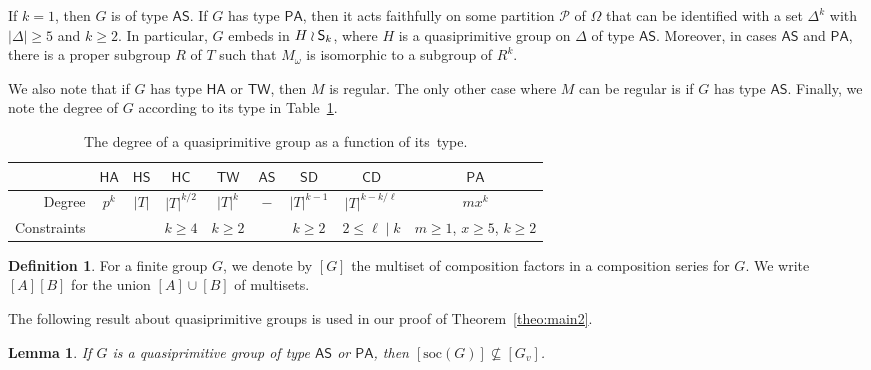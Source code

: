 \documentclass[twoside,12pt,leqno]{amsproc}
\numberwithin{table}{section}
\numberwithin{figure}{section}
\theoremstyle{plain}
\newtheorem{lemma}[theorem]{Lemma}
\theoremstyle{definition}\newtheorem{definition}[theorem]{Definition}
\theoremstyle{definition}\newtheorem{example}[theorem]{Example}
\theoremstyle{definition}\newtheorem{construction}[theorem]{Construction}
\theoremstyle{definition}\newtheorem{remark}[theorem]{Remark}
\theoremstyle{definition}\newtheorem{problem}[theorem]{Problem}
\begin{document}
If $k=1$, then $G$ is of type ${\mathsf{AS}}$. If $G$ has type ${\mathsf{PA}}$, then it acts faithfully on some partition $\mathcal{P}$ of $\Omega$ that can be identified with a set $\Delta^k$ with $|\Delta|{\geqslant} 5$ and $k{\geqslant} 2$. In particular, $G$ embeds in $H\wr{\textup{\textsf{S}}}_k$, where $H$ is a  quasiprimitive group on $\Delta$ of type ${\mathsf{AS}}$. Moreover, in cases ${\mathsf{AS}}$ and ${\mathsf{PA}}$, there is a proper subgroup $R$ of $T$ such that $M_\omega$ is isomorphic to a subgroup of $R^k$. 

We also note that if $G$ has type  ${\mathsf{HA}}$ or  ${\mathsf{TW}}$, then $M$ is regular. The only other case where $M$ can be regular is if $G$ has type ${\mathsf{AS}}$. Finally, we note the degree of $G$ according to its type in Table~\ref{TblONS}.

\begin{center}
\begin{table}[!ht]
\caption{The degree of a quasiprimitive group as a function of its~type.}\label{TblONS}
\begin{tabular}{r|cccccccc}
\toprule
  &${\mathsf{HA}}$&${\mathsf{HS}}$&${\mathsf{HC}}$&${\mathsf{TW}}$&${\mathsf{AS}}$&${\mathsf{SD}}$&${\mathsf{CD}}$&${\mathsf{PA}}$\\ \hline
Degree &$p^k$&$|T|$&$|T|^{k/2}$&$|T|^k$&$-$&$|T|^{k-1}$&$|T|^{k-k/\ell}$& $mx^k$\\
Constraints& & &$k{\geqslant}4$&$k{\geqslant}2$& &$k{\geqslant}2$&$2{\leqslant}\ell\mid k$& $m{\geqslant} 1$, $x{\geqslant} 5$, $k{\geqslant} 2$ \\
\bottomrule
\end{tabular}
\end{table}
\end{center}

\begin{definition}\label{def:comp}
For a finite group $G$, we denote by $[G]$ the multiset of composition factors in a composition series for $G$. We write $[A][B]$ for the union $[A]\cup [B]$ of multisets.
\end{definition}

The following result about quasiprimitive groups is used in our proof of Theorem~\ref{theo:main2}.

\begin{lemma}\label{CompFactorsPA}
If $G$ is a quasiprimitive group of type ${\mathsf{AS}}$ or ${\mathsf{PA}}$, then $[{{\mathrm{soc}}}(G)]\not\subseteq[G_v]$.
\end{lemma}
\end{document}
